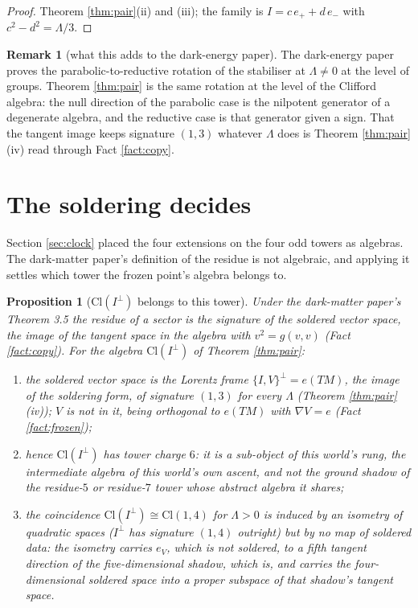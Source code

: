 \documentclass[11pt]{article}
\newtheorem{proposition}[theorem]{Proposition}
\theoremstyle{definition}
\newtheorem{remark}[theorem]{Remark}
\newcommand{\Cl}{\mathrm{Cl}}
\begin{document}
\begin{proof}
Theorem \ref{thm:pair}(ii) and (iii); the family is $I = c\,e_{+} + d\,e_{-}$ with $c^{2} - d^{2} = \Lambda/3$.
\end{proof}

\begin{remark}[what this adds to the dark-energy paper]\label{rem:t10}
The dark-energy paper proves the parabolic-to-reductive rotation of the stabiliser at $\Lambda \neq 0$ at the level of groups. Theorem \ref{thm:pair} is the same rotation at the level of the Clifford algebra: the null direction of the parabolic case is the nilpotent generator of a degenerate algebra, and the reductive case is that generator given a sign. That the tangent image keeps signature $(1,3)$ whatever $\Lambda$ does is Theorem \ref{thm:pair}(iv) read through Fact \ref{fact:copy}.
\end{remark}

\section{The soldering decides}\label{sec:soldering}

Section \ref{sec:clock} placed the four extensions on the four odd towers as algebras. The dark-matter paper's definition of the residue is not algebraic, and applying it settles which tower the frozen point's algebra belongs to.

\begin{proposition}[$\Cl(I^{\perp})$ belongs to this tower]\label{prop:belongs}
Under the dark-matter paper's Theorem 3.5 the residue of a sector is the signature of the soldered vector space, the image of the tangent space in the algebra with $v^{2} = g(v,v)$ (Fact \ref{fact:copy}). For the algebra $\Cl(I^{\perp})$ of Theorem \ref{thm:pair}:
\begin{enumerate}
\item[(i)] the soldered vector space is the Lorentz frame $\{I,V\}^{\perp} = e(TM)$, the image of the soldering form, of signature $(1,3)$ for every $\Lambda$ (Theorem \ref{thm:pair}(iv)); $V$ is not in it, being orthogonal to $e(TM)$ with $\nabla V = e$ (Fact \ref{fact:frozen});
\item[(ii)] hence $\Cl(I^{\perp})$ has tower charge $6$: it is a sub-object of this world's rung, the intermediate algebra of this world's own ascent, and not the ground shadow of the residue-$5$ or residue-$7$ tower whose abstract algebra it shares;
\item[(iii)] the coincidence $\Cl(I^{\perp}) \cong \Cl(1,4)$ for $\Lambda > 0$ is induced by an isometry of quadratic spaces ($I^{\perp}$ has signature $(1,4)$ outright) but by no map of soldered data: the isometry carries $e_{V}$, which is not soldered, to a fifth tangent direction of the five-dimensional shadow, which is, and carries the four-dimensional soldered space into a proper subspace of that shadow's tangent space.
\end{enumerate}
\end{proposition}
\end{document}

